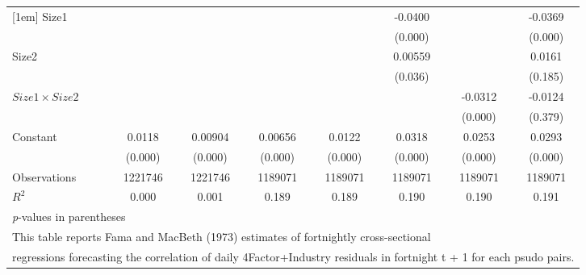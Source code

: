 {\begin{tabular}{l*{7}{c}}
[1em]
Size1               &                     &                     &                     &                     &     -0.0400\sym{***}&                     &     -0.0369\sym{***}\\
                    &                     &                     &                     &                     &     (0.000)         &                     &     (0.000)         \\
[1em]
Size2               &                     &                     &                     &                     &     0.00559\sym{*}  &                     &      0.0161         \\
                    &                     &                     &                     &                     &     (0.036)         &                     &     (0.185)         \\
[1em]
$ Size1 \times Size2 $&                     &                     &                     &                     &                     &     -0.0312\sym{***}&     -0.0124         \\
                    &                     &                     &                     &                     &                     &     (0.000)         &     (0.379)         \\
[1em]
Constant            &      0.0118\sym{***}&     0.00904\sym{***}&     0.00656\sym{***}&      0.0122\sym{***}&      0.0318\sym{***}&      0.0253\sym{***}&      0.0293\sym{***}\\
                    &     (0.000)         &     (0.000)         &     (0.000)         &     (0.000)         &     (0.000)         &     (0.000)         &     (0.000)         \\
\hline
Observations        &     1221746         &     1221746         &     1189071         &     1189071         &     1189071         &     1189071         &     1189071         \\
\(R^{2}\)           &       0.000         &       0.001         &       0.189         &       0.189         &       0.190         &       0.190         &       0.191         \\
\hline\hline
\multicolumn{8}{l}{\footnotesize \textit{p}-values in parentheses}\\
\multicolumn{8}{l}{\footnotesize This table reports Fama and MacBeth (1973) estimates of fortnightly cross-sectional}\\
\multicolumn{8}{l}{\footnotesize  regressions forecasting the correlation of daily 4Factor+Industry residuals in fortnight t + 1 for each psudo pairs.}\\

\end{tabular}}
